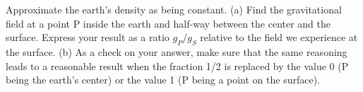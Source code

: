 Approximate the earth's density as being constant.
(a) Find the gravitational field at a point P inside the earth and half-way between
the center and the surface. Express your result as a ratio $g_P/g_S$ relative to the
field we experience at the surface. (b) As a check on your answer, make sure that the
same reasoning leads to a reasonable result when the fraction 1/2 is replaced by
the value 0 (P being the earth's center) or the value 1 (P being a point on the surface).

